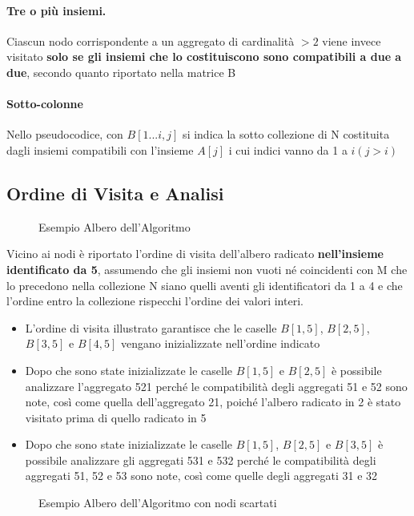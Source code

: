 \paragraph{Tre o più insiemi.}
Ciascun nodo corrispondente a un aggregato di cardinalità $>2$ viene invece visitato \textbf{solo se gli insiemi che lo costituiscono sono compatibili a due a due}, secondo quanto riportato nella matrice B
\paragraph{Sotto-colonne}
Nello pseudocodice, con $B[1...i, j]$ si indica la sotto collezione di N costituita dagli insiemi compatibili con l’insieme $A[j]$ i cui indici vanno da 1 a $i (j>i)$

\subsection{Ordine di Visita e Analisi}
\begin{figure}[H]
  \centering
  
  \caption{Esempio Albero dell'Algoritmo}
\end{figure}
Vicino ai nodi è riportato l’ordine di visita dell’albero radicato \textbf{nell’insieme identificato da 5}, assumendo che gli insiemi non vuoti né coincidenti con M che lo precedono nella collezione N siano quelli aventi gli identificatori da 1 a 4 e che l’ordine entro la collezione rispecchi l’ordine dei valori interi.
\begin{itemize}
    \item L’ordine di visita illustrato garantisce che le caselle $B[1,5]$, $B[2,5]$, $B[3,5]$ e $B[4,5]$ vengano inizializzate nell’ordine indicato
    \item Dopo che sono state inizializzate le caselle $B[1,5]$ e $B[2,5]$ è possibile analizzare l’aggregato 521 perché le compatibilità degli aggregati 51 e 52 sono note, così come quella dell’aggregato 21, poiché l’albero radicato in 2 è stato visitato prima di quello radicato in 5
    \item Dopo che sono state inizializzate le caselle $B[1,5]$, $B[2,5]$ e $B[3,5]$ è possibile analizzare gli aggregati 531 e 532 perché le compatibilità degli aggregati 51, 52 e 53 sono note, così come quelle degli aggregati 31 e 32
\end{itemize}
\begin{figure}[H]
  \centering
  
  \caption{Esempio Albero dell'Algoritmo con nodi scartati}
\end{figure}
